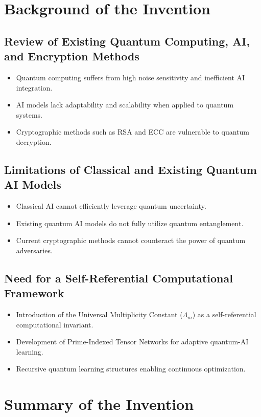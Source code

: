 \documentclass{article}
\theoremstyle{plain}
\begin{document}
\begin{itemize}
\section{Background of the Invention}

\subsection{Review of Existing Quantum Computing, AI, and Encryption Methods}
\begin{itemize}
    \item Quantum computing suffers from high noise sensitivity and inefficient AI integration.
    \item AI models lack adaptability and scalability when applied to quantum systems.
    \item Cryptographic methods such as RSA and ECC are vulnerable to quantum decryption.
\end{itemize}

\subsection{Limitations of Classical and Existing Quantum AI Models}
\begin{itemize}
    \item Classical AI cannot efficiently leverage quantum uncertainty.
    \item Existing quantum AI models do not fully utilize quantum entanglement.
    \item Current cryptographic methods cannot counteract the power of quantum adversaries.
\end{itemize}

\subsection{Need for a Self-Referential Computational Framework}
\begin{itemize}
    \item Introduction of the Universal Multiplicity Constant ($\Lambda_m$) as a self-referential computational invariant.
    \item Development of Prime-Indexed Tensor Networks for adaptive quantum-AI learning.
    \item Recursive quantum learning structures enabling continuous optimization.
\end{itemize}

\section{Summary of the Invention}


\end{itemize}
\end{document}
